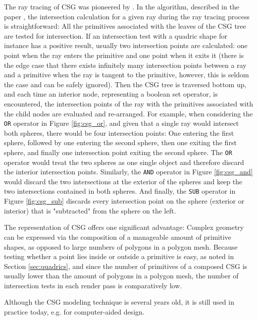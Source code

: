 The ray tracing of CSG was pioneered by \cite{roth1982ray}. In the algorithm, described in the paper , the intersection calculation for a given ray during the ray tracing process is straightforward: 
All the primitives associated with the leaves of the CSG tree are tested for intersection. If an intersection test with a quadric shape for instance has a positive result, usually two intersection points are calculated: one point when the ray enters the primitive and one point when it exits it (there is the edge case that there exists infinitely many intersection points between a ray and a primitive when the ray is tangent to the primitive, however, this is seldom the case and can be safely ignored). Then the CSG tree is traversed bottom up, and each time an interior node, representing a boolean set operator, is encountered, the intersection points of the ray with the primitives associated with the child nodes are evaluated and re-arranged. For example, when considering the \texttt{OR} operator in Figure \ref{fig:csg_or}, and given that a single ray would intersect both spheres, there would be four intersection points: One entering the first sphere, followed by one entering the second sphere, then one exiting the first sphere, and finally one intersection point exiting the second sphere. The \texttt{OR} operator would treat the two spheres as one single object and therefore discard the interior intersection points. Similarly, the \texttt{AND} operator in Figure \ref{fig:csg_and} would discard the two intersections at the exterior of the spheres and keep the two intersections contained in both spheres.
And finally, the \texttt{SUB} operator in Figure \ref{fig:csg_sub} discards every intersection point on the sphere (exterior or interior) that is "subtracted" from the sphere on the left.

The representation of CSG offers one significant advantage: Complex geometry can be expressed via the composition of a manageable amount of primitive shapes, as opposed to large numbers of polygons in a polygon mesh. Because testing whether a point lies inside or outside a primitive is easy, as noted in Section \ref{sec:quadrics}, and since the number of primitives of a composed CSG is usually lower than the amount of polygons in a polygon mesh, the number of intersection tests in each render pass is comparatively low.

Although the CSG modeling technique is several years old, it is still used in practice today, e.g. for computer-aided design.


